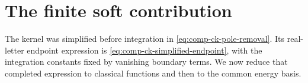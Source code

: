 \section{The finite soft contribution}
\label{sec:comp-ck-simplification}
The kernel was simplified before integration in
\eqref{eq:comp-ck-pole-removal}. Its real-letter endpoint expression is
\eqref{eq:comp-ck-simplified-endpoint}, with the integration constants
fixed by vanishing boundary terms. We now reduce that completed
expression to classical functions and then to the common energy basis.

